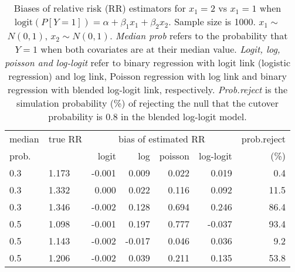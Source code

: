 \documentclass[12pt,a4paper]{article}
\begin{document}
\begin{table}[H] 
\small\sf\centering 
\caption{Biases of relative risk (RR) estimators for $x_1=2$ vs $x_1=1$ when $\mbox{logit}(P[Y=1])=\alpha+\beta_1 x_1 + \beta_2 x_2$. Sample size is 1000. $x_1 \sim $$N(0,1)$, $x_2 \sim N(0,1)$. {\it Median prob} refers to the probability that $Y=1$ when both covariates are at their median value. {\it Logit, log, poisson and log-logit} refer to binary regression with logit link (logistic regression) and log link, Poisson regression with log link and binary regression with blended log-logit link, respectively. {\it Prob.reject} is the simulation probability (\%) of rejecting the null that the cutover probability is $0.8$ in the blended log-logit model.} 
\begin{tabular}{llrrrrr} 
\toprule 
median & true RR & \multicolumn{4}{c}{bias of estimated RR} & prob.reject \\ 
prob. & & logit & log & poisson & log-logit  & (\%) \\ \midrule 
0.3 & 1.173 & -0.001 &  0.009 & 0.022 &  0.019 &  0.4 \\  
0.3 & 1.332 &  0.000 &  0.022 & 0.116 &  0.092 & 11.5 \\  
0.3 & 1.346 & -0.002 &  0.128 & 0.694 &  0.246 & 86.4 \\  
0.5 & 1.098 & -0.001 &  0.197 & 0.777 & -0.037 & 93.4 \\  
0.5 & 1.143 & -0.002 & -0.017 & 0.046 &  0.036 &  9.2 \\  
0.5 & 1.206 & -0.002 &  0.039 & 0.211 &  0.135 & 53.8 \\  
\bottomrule 
\end{tabular} 
\end{table} 
\end{document}
